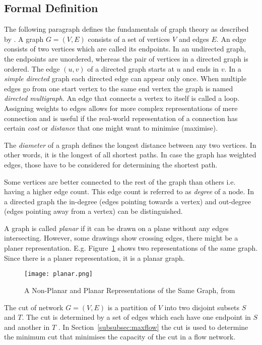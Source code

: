 \documentclass[final]{fhnwreport}       %
\begin{document}
\subsection{Formal Definition}\label{subsec:formal}
The following paragraph defines the fundamentals of graph theory as described by \citet{rosen_discrete_2012}.
A graph $G=(V,E)$ consists of a set of vertices $V$ and edges $E$. An edge consists of two vertices which are called its endpoints. In an undirected graph, the endpoints are unordered, whereas the pair of vertices in a directed graph is ordered. The edge $(u, v)$ of a directed graph starts at $u$ and ends in $v$. In a \emph{simple directed} graph each directed edge can appear only once. When multiple edges go from one start vertex to the same end vertex the graph is named \emph{directed multigraph}. An edge that connects a vertex to itself is called a loop. Assigning weights to edges allows for more complex representations of mere connection and is useful if the real-world representation of a connection has certain \emph{cost} or \emph{distance} that one might want to minimise (maximise). 

The \emph{diameter} of a graph defines the longest distance between any two vertices. In other words, it is the longest of all shortest paths. In case the graph has weighted edges, those have to be considered for determining the shortest path.

Some vertices are better connected to the rest of the graph than others i.e. having a higher edge count. This edge count is referred to as \emph{degree} of a node. In a directed graph the in-degree (edges pointing towards a vertex) and out-degree (edges pointing away from a vertex) can be distinguished. 

A graph is called \emph{planar} if it can be drawn on a plane without any edges intersecting. However, some drawings show crossing edges, there might be a planer representation. E.g. Figure~\ref{fig:planar} shows two representations of the same graph. Since there is a planer representation, it is a planar graph. 

\begin{figure}[H]
\centering
\texttt{[image: planar.png]}
\caption{A Non-Planar and Planar Representations of the Same Graph, from \cite{rosen_discrete_2012}}
\label{fig:planar}
\end{figure}

The cut of network $G=(V,E)$ is a partition of $V$ into two disjoint subsets $S$ and $T$. The cut is determined by a set of edges which each have one endpoint in $S$ and another in $T$ \citep{brossard_graph_2010}. In Section~\ref{subsubsec:maxflow} the cut is used to determine the minimum cut that minimises the capacity of the cut in a flow network.
\end{document}

